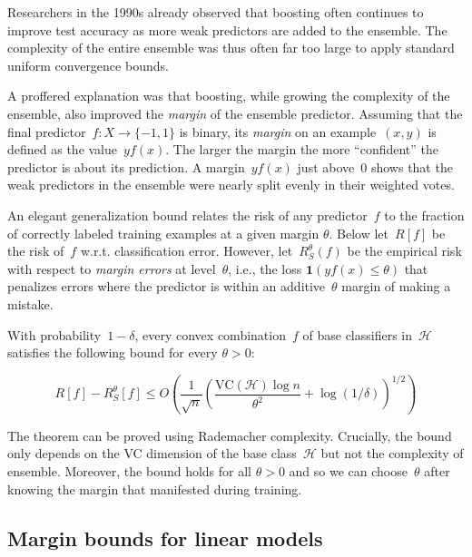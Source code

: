 \documentclass{tufte-book}
\begin{document}
Researchers in the 1990s already observed that boosting often continues
to improve test accuracy as more weak predictors are added to the
ensemble. The complexity of the entire ensemble was thus often far too
large to apply standard uniform convergence bounds.

A proffered explanation was that boosting, while growing the complexity
of the ensemble, also improved the \emph{margin} of the ensemble
predictor. Assuming that the final predictor~\(f\colon X\to \{-1,1\}\)
is binary, its \emph{margin} on an example~\((x,y)\) is defined as the
value~\(yf(x)\). The larger the margin the more ``confident'' the
predictor is about its prediction. A margin~\(yf(x)\) just above~\(0\)
shows that the weak predictors in the ensemble were nearly split evenly
in their weighted votes.

An elegant generalization bound relates the risk of any predictor~\(f\)
to the fraction of correctly labeled training examples at a given margin
\(\theta.\) Below let~\(R[f]\) be the risk of~\(f\) w.r.t.
classification error. However, let~\(R^\theta_S(f)\) be the empirical
risk with respect to \emph{margin errors} at level~\(\theta\), i.e., the
loss \(\mathbf{1}(yf(x)\le\theta)\) that penalizes errors where the
predictor is within an additive~\(\theta\) margin of making a mistake.

\begin{Theorem}

With probability~\(1-\delta\), every convex combination~\(f\) of base
classifiers in~\(\mathcal{H}\) satisfies the following bound for every
\(\theta>0:\)

\[
R[f]
- R^\theta_S[f]
\le O\left(
\frac1{\sqrt{n}}\left(\frac{
\mathrm{VC}(\mathcal{H})\log n}{\theta^2}
+\log(1/\delta)
\right)^{1/2}
\right)
\]

\end{Theorem}

The theorem can be proved using Rademacher complexity. Crucially, the
bound only depends on the VC dimension of the base class~\(\mathcal{H}\)
but not the complexity of ensemble. Moreover, the bound holds for all
\(\theta>0\) and so we can choose~\(\theta\) after knowing the margin
that manifested during training.

\hypertarget{margin-bounds-for-linear-models}{%
\subsection{Margin bounds for linear
models}\label{margin-bounds-for-linear-models}}
\end{document}
